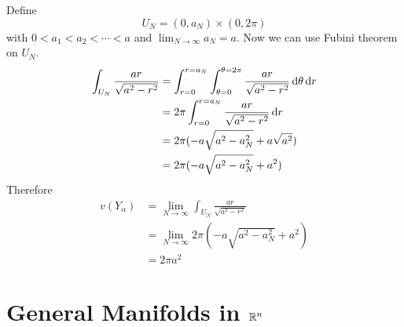 \begin{itemize}
    Define 
    $$U_N=(0,a_N)\times(0,2\pi)$$ with $0<a_1<a_2<\cdots<a$ and $\lim_{N\to\infty}a_N=a$.
    Now we can use Fubini theorem on $U_N$.
    \begin{equation*}
        \begin{split}
            \int_{U_N}\frac{ar}{\sqrt{a^2-r^2}} &= \int_{r=0}^{r=a_N}\int_{\theta=0}^{\theta=2\pi}\frac{ar}{\sqrt{a^2-r^2}}\operatorname{d\!}\theta \operatorname{d\!} r\\
            &= 2\pi \int_{r=0}^{r=a_N}\frac{ar}{\sqrt{a^2-r^2}}\operatorname{d\!} r\\
            &= 2\pi(-a\sqrt{a^2-a_N^2}+a\sqrt{a^2})\\
            &= 2\pi(-a\sqrt{a^2-a_N^2}+a^2)
        \end{split}
    \end{equation*}
    Therefore 
    \begin{equation*}
        \begin{split}
            v(Y_{\alpha})&= \lim_{N\to\infty}\int_{U_N}\frac{ar}{\sqrt{a^2-r^2}}\\
            &= \lim_{N\to\infty}2\pi(-a\sqrt{a^2-a_N^2}+a^2)\\
            &= 2\pi a^2
        \end{split}
    \end{equation*}
\end{itemize}

\section{General Manifolds in $\mathbb{R}^n$}

